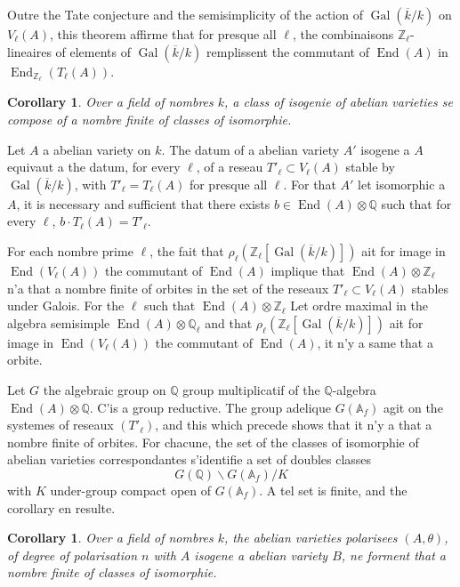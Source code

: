 \documentclass[12pt,a4paper]{article}
\theoremstyle{plain}
\newtheorem{corollary}[theorem]{Corollary}
\theoremstyle{definition}
\theoremstyle{remark}
\DeclareMathOperator{\End}{End}
\DeclareMathOperator{\Gal}{Gal}
\newcommand{\QQ}{\mathbb{Q}}
\newcommand{\ZZ}{\mathbb{Z}}
\providecommand{\AA}{\mathbb{A}}
\providecommand{\QQ}{\mathbb{Q}}
\providecommand{\ZZ}{\mathbb{Z}}
\providecommand{\End}{\operatorname{End}}
\providecommand{\Gal}{\operatorname{Gal}}
\begin{document}
Outre the Tate conjecture and the semisimplicity of the action of $\Gal(\overline{k}/k)$ on $V_\ell(A)$, this theorem affirme that for presque all $\ell$, the combinaisons $\ZZ_\ell$-lineaires of elements of $\Gal(\overline{k}/k)$ remplissent the commutant of $\End(A)$ in $\End_{\ZZ_\ell}(T_\ell(A))$.

\begin{corollary}
Over a field of nombres $k$, a class of isogenie of abelian varieties se compose of a nombre finite of classes of isomorphie.
\end{corollary}

Let $A$ a abelian variety on $k$. The datum of a abelian variety $A'$ isogene a $A$ equivaut a the datum, for every $\ell$, of a reseau $T'_\ell \subset V_\ell(A)$ stable by $\Gal(\overline{k}/k)$, with $T'_\ell = T_\ell(A)$ for presque all $\ell$. For that $A'$ let isomorphic a $A$, it is necessary and sufficient that there exists $b \in \End(A) \otimes \QQ$ such that for every $\ell$, $b \cdot T_\ell(A) = T'_\ell$.

For each nombre prime $\ell$, the fait that $\rho_\ell(\ZZ_\ell[\Gal(\overline{k}/k)])$ ait for image in $\End(V_\ell(A))$ the commutant of $\End(A)$ implique that $\End(A) \otimes \ZZ_\ell$ n'a that a nombre finite of orbites in the set of the reseaux $T'_\ell \subset V_\ell(A)$ stables under Galois. For the $\ell$ such that $\End(A) \otimes \ZZ_\ell$ Let ordre maximal in the algebra semisimple $\End(A) \otimes \QQ_\ell$ and that $\rho_\ell(\ZZ_\ell[\Gal(\overline{k}/k)])$ ait for image in $\End(V_\ell(A))$ the commutant of $\End(A)$, it n'y a same that a orbite.

Let $G$ the algebraic group on $\QQ$ group multiplicatif of the $\QQ$-algebra $\End(A) \otimes \QQ$. C'is a group reductive. The group adelique $G(\AA_f)$ agit on the systemes of reseaux $(T'_\ell)$, and this which precede shows that it n'y a that a nombre finite of orbites. For chacune, the set of the classes of isomorphie of abelian varieties correspondantes s'identifie a set of doubles classes
\[
G(\QQ) \backslash G(\AA_f) / K
\]
with $K$ under-group compact open of $G(\AA_f)$. A tel set is finite, and the corollary en resulte.

\begin{corollary}
Over a field of nombres $k$, the abelian varieties polarisees $(A,\theta)$, of degree of polarisation $n$ with $A$ isogene a abelian variety $B$, ne forment that a nombre finite of classes of isomorphie.
\end{corollary}
\end{document}
